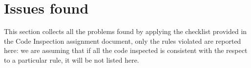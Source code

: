 \newpage
\section{Issues found}
This section collects all the problems found by applying the checklist provided in the Code Inspection assignment document, only the rules violated are reported here: we are assuming that if all the code inspected is consistent with the respect to a particular rule, it will be not listed here.